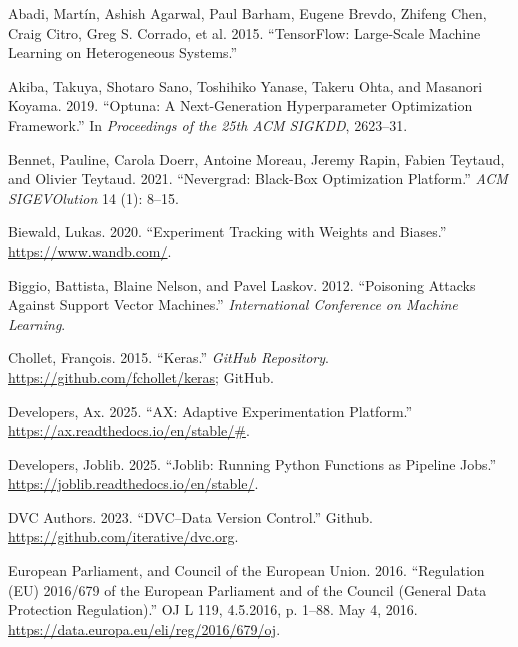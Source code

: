 \documentclass[
]{article}
\newlength{\cslhangindent}
\newlength{\cslentryspacingunit} %
\newenvironment{CSLReferences}[2] %
 {%
  \setlength{\parindent}{0pt}
  \ifodd #1
  \let\oldpar\par
  \def\par{\hangindent=\cslhangindent\oldpar}
  \fi
  \setlength{\parskip}{#2\cslentryspacingunit}
 }%
 {}
\begin{document}
\hypertarget{refs}{}
\begin{CSLReferences}{1}{0}
\leavevmode{}%
Abadi, Martín, Ashish Agarwal, Paul Barham, Eugene Brevdo, Zhifeng Chen,
Craig Citro, Greg S. Corrado, et al. 2015. {``{TensorFlow}: Large-Scale
Machine Learning on Heterogeneous Systems.''}

\leavevmode{}%
Akiba, Takuya, Shotaro Sano, Toshihiko Yanase, Takeru Ohta, and Masanori
Koyama. 2019. {``Optuna: A Next-Generation Hyperparameter Optimization
Framework.''} In \emph{Proceedings of the 25th ACM SIGKDD}, 2623--31.

\leavevmode{}%
Bennet, Pauline, Carola Doerr, Antoine Moreau, Jeremy Rapin, Fabien
Teytaud, and Olivier Teytaud. 2021. {``Nevergrad: Black-Box Optimization
Platform.''} \emph{ACM SIGEVOlution} 14 (1): 8--15.

\leavevmode{}%
Biewald, Lukas. 2020. {``Experiment Tracking with Weights and Biases.''}
\url{https://www.wandb.com/}.

\leavevmode{}%
Biggio, Battista, Blaine Nelson, and Pavel Laskov. 2012. {``Poisoning
Attacks Against Support Vector Machines.''} \emph{International
Conference on Machine Learning}.

\leavevmode{}%
Chollet, François. 2015. {``Keras.''} \emph{GitHub Repository}.
\url{https://github.com/fchollet/keras}; GitHub.

\leavevmode{}%
Developers, Ax. 2025. {``AX: Adaptive Experimentation Platform.''}
\url{https://ax.readthedocs.io/en/stable/\#}.

\leavevmode{}%
Developers, Joblib. 2025. {``Joblib: Running Python Functions as
Pipeline Jobs.''} \url{https://joblib.readthedocs.io/en/stable/}.

\leavevmode{}%
DVC Authors. 2023. {``{DVC}--{Data Version Control}.''} Github.
\url{https://github.com/iterative/dvc.org}.

\leavevmode{}%
European Parliament, and Council of the European Union. 2016.
{``Regulation ({EU}) 2016/679 of the {European} {Parliament} and of the
{Council} ({General} {Data}
{Protection} {Regulation}).''} OJ L 119, 4.5.2016, p. 1--88. May 4,
2016. \url{https://data.europa.eu/eli/reg/2016/679/oj}.


\end{CSLReferences}
\end{document}
